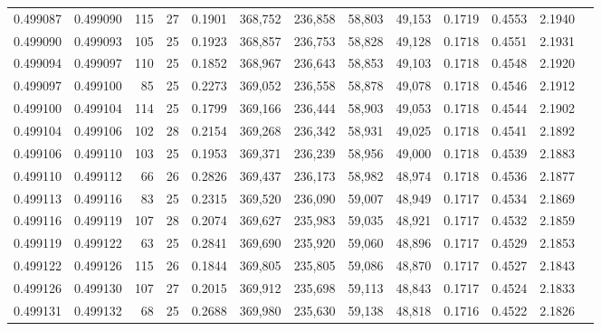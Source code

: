 \begin{tabular}{rrrrrrrrrrrrr}
0.499087 & 0.499090 & 115 &  27 &                                     0.1901 & 368,752 & 236,858 &  58,803 &  49,153 & 0.1719 & 0.4553 & 2.1940 \\
0.499090 & 0.499093 & 105 &  25 &                                     0.1923 & 368,857 & 236,753 &  58,828 &  49,128 & 0.1718 & 0.4551 & 2.1931 \\
0.499094 & 0.499097 & 110 &  25 &                                     0.1852 & 368,967 & 236,643 &  58,853 &  49,103 & 0.1718 & 0.4548 & 2.1920 \\
0.499097 & 0.499100 &  85 &  25 &                                     0.2273 & 369,052 & 236,558 &  58,878 &  49,078 & 0.1718 & 0.4546 & 2.1912 \\
0.499100 & 0.499104 & 114 &  25 &                                     0.1799 & 369,166 & 236,444 &  58,903 &  49,053 & 0.1718 & 0.4544 & 2.1902 \\
0.499104 & 0.499106 & 102 &  28 &                                     0.2154 & 369,268 & 236,342 &  58,931 &  49,025 & 0.1718 & 0.4541 & 2.1892 \\
0.499106 & 0.499110 & 103 &  25 &                                     0.1953 & 369,371 & 236,239 &  58,956 &  49,000 & 0.1718 & 0.4539 & 2.1883 \\
0.499110 & 0.499112 &  66 &  26 &                                     0.2826 & 369,437 & 236,173 &  58,982 &  48,974 & 0.1718 & 0.4536 & 2.1877 \\
0.499113 & 0.499116 &  83 &  25 &                                     0.2315 & 369,520 & 236,090 &  59,007 &  48,949 & 0.1717 & 0.4534 & 2.1869 \\
0.499116 & 0.499119 & 107 &  28 &                                     0.2074 & 369,627 & 235,983 &  59,035 &  48,921 & 0.1717 & 0.4532 & 2.1859 \\
0.499119 & 0.499122 &  63 &  25 &                                     0.2841 & 369,690 & 235,920 &  59,060 &  48,896 & 0.1717 & 0.4529 & 2.1853 \\
0.499122 & 0.499126 & 115 &  26 &                                     0.1844 & 369,805 & 235,805 &  59,086 &  48,870 & 0.1717 & 0.4527 & 2.1843 \\
0.499126 & 0.499130 & 107 &  27 &                                     0.2015 & 369,912 & 235,698 &  59,113 &  48,843 & 0.1717 & 0.4524 & 2.1833 \\
0.499131 & 0.499132 &  68 &  25 &                                     0.2688 & 369,980 & 235,630 &  59,138 &  48,818 & 0.1716 & 0.4522 & 2.1826 \\

\end{tabular}

